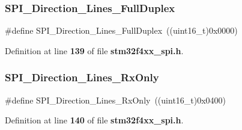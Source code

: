 \subsubsection{S\+P\+I\+\_\+\+Direction\+\_\+Lines\+\_\+\+Full\+Duplex}
{\footnotesize\ttfamily \#define S\+P\+I\+\_\+\+Direction\+\_\+Lines\+\_\+\+Full\+Duplex~((uint16\+\_\+t)0x0000)}



Definition at line \textbf{ 139} of file \textbf{ stm32f4xx\+\_\+spi.\+h}.

\mbox{\label{group__SPI__data__direction_gab8ab942f7240394f50e4c86c5288516a}} 
\subsubsection{S\+P\+I\+\_\+\+Direction\+\_\+Lines\+\_\+\+Rx\+Only}
{\footnotesize\ttfamily \#define S\+P\+I\+\_\+\+Direction\+\_\+Lines\+\_\+\+Rx\+Only~((uint16\+\_\+t)0x0400)}



Definition at line \textbf{ 140} of file \textbf{ stm32f4xx\+\_\+spi.\+h}.

